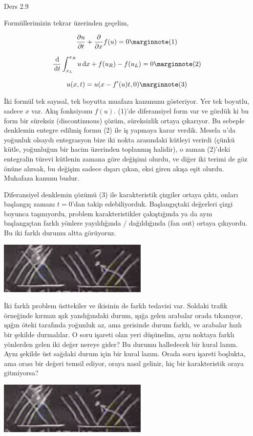 \documentclass[12pt,fleqn]{article}\usepackage{../../common}
\begin{document}
Ders 2.9

Formüllerimizin tekrar üzerinden geçelim,

$$
\frac{\partial u}{\partial t} +
\frac{\partial }{\partial x} f(u) = 0
\mlabel{1}
$$

$$
\frac{\ud}{\ud t} \int_{x_L}^{x_R} u \ud x + f(u_R) - f(u_L) = 0
\mlabel{2}
$$

$$
u(x,t) = u(x - f'(u) t, 0)
\mlabel{3}
$$

İki formül tek sayısal, tek boyutta muafaza kanununu gösteriyor. Yer tek
boyutlu, sadece $x$ var. Akış fonksiyonu $f(u)$. (1)'de diferansiyel form var ve
gördük ki bu form bir süreksiz (discontinuous) çözüm, süreksizlik ortaya
çıkarıyor. Bu sebeple denklemin entegre edilmiş formu (2) ile iş yapmaya karar
verdik. Mesela $u$'da yoğunluk olsaydı entegrasyon bize iki nokta arasındaki
kütleyi verirdi (çünkü kütle, yoğunluğun bir hacim üzerinden toplanmış halidir),
o zaman (2)'deki entegralin türevi kütlenin zamana göre değişimi olurdu, ve
diğer iki terimi de göz önüne alırsak, bu değişim sadece dışarı çıkan, eksi
giren akışa eşit olurdu. Muhafaza kanunu budur. 

Diferansiyel denklemin çözümü (3) ile karakteristik çizgiler ortaya çıktı,
onları başlangıç zamanı $t=0$'dan takip edebiliyorduk. Başlangıçtaki değerleri
çizgi boyunca taşınıyordu, problem karakteristikler çakıştığında ya da aynı
başlangıçtan farklı yönlere yayıldığında / dağıldığında (fan out) ortaya
çıkıyordu. Bu iki farklı durumu altta görüyoruz.

\includegraphics[width=20em]{compscieng_2_09_01.png}

İki farklı problem üsttekiler ve ikisinin de farklı tedavisi var. Soldaki trafik
örneğinde kırmızı ışık yandığındaki durum, ışığa gelen arabalar orada tıkanıyor,
ışığın öteki tarafında yoğunluk az, ama gerisinde durum farklı, ve arabalar
hızlı bir şekilde durmalılar. O soru işareti olan yeri düşünelim, aynı noktaya
farklı yönlerden gelen iki değer nereye gider? Bu durumu halledecek bir kural
lazım. Aynı şekilde üst sağdaki durum için bir kural lazım. Orada soru işareti
boşlukta, ama orası bir değeri temsil ediyor, oraya nasıl gelinir, hiç bir
karakteristik oraya gitmiyorsa?

\includegraphics[width=20em]{compscieng_2_09_01.png}
\end{document}
